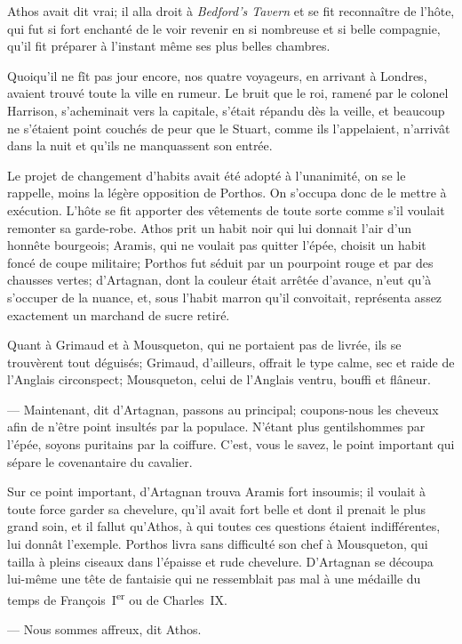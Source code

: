 Athos avait dit vrai; il alla droit à \textit{Bedford's Tavern} et se fit reconnaître de l'hôte, qui fut si fort enchanté de le voir revenir en si nombreuse et si belle compagnie, qu'il fit préparer à l'instant même ses plus belles chambres.

Quoiqu'il ne fît pas jour encore, nos quatre voyageurs, en arrivant à Londres, avaient trouvé toute la ville en rumeur. Le bruit que le roi, ramené par le colonel Harrison, s'acheminait vers la capitale, s'était répandu dès la veille, et beaucoup ne s'étaient point couchés de peur que le Stuart, comme ils l'appelaient, n'arrivât dans la nuit et qu'ils ne manquassent son entrée.

Le projet de changement d'habits avait été adopté à l'unanimité, on se le rappelle, moins la légère opposition de Porthos. On s'occupa donc de le mettre à exécution. L'hôte se fit apporter des vêtements de toute sorte comme s'il voulait remonter sa garde-robe. Athos prit un habit noir qui lui donnait l'air d'un honnête bourgeois; Aramis, qui ne voulait pas quitter l'épée, choisit un habit foncé de coupe militaire; Porthos fut séduit par un pourpoint rouge et par des chausses vertes; d'Artagnan, dont la couleur était arrêtée d'avance, n'eut qu'à s'occuper de la nuance, et, sous l'habit marron qu'il convoitait, représenta assez exactement un marchand de sucre retiré.

Quant à Grimaud et à Mousqueton, qui ne portaient pas de livrée, ils se trouvèrent tout déguisés; Grimaud, d'ailleurs, offrait le type calme, sec et raide de l'Anglais circonspect; Mousqueton, celui de l'Anglais ventru, bouffi et flâneur.

— Maintenant, dit d'Artagnan, passons au principal; coupons-nous les cheveux afin de n'être point insultés par la populace. N'étant plus gentilshommes par l'épée, soyons puritains par la coiffure. C'est, vous le savez, le point important qui sépare le covenantaire du cavalier.

Sur ce point important, d'Artagnan trouva Aramis fort insoumis; il voulait à toute force garder sa chevelure, qu'il avait fort belle et dont il prenait le plus grand soin, et il fallut qu'Athos, à qui toutes ces questions étaient indifférentes, lui donnât l'exemple. Porthos livra sans difficulté son chef à Mousqueton, qui tailla à pleins ciseaux dans l'épaisse et rude chevelure. D'Artagnan se découpa lui-même une tête de fantaisie qui ne ressemblait pas mal à une médaille du temps de François~I\textsuperscript{er} ou de Charles~IX.

— Nous sommes affreux, dit Athos.

